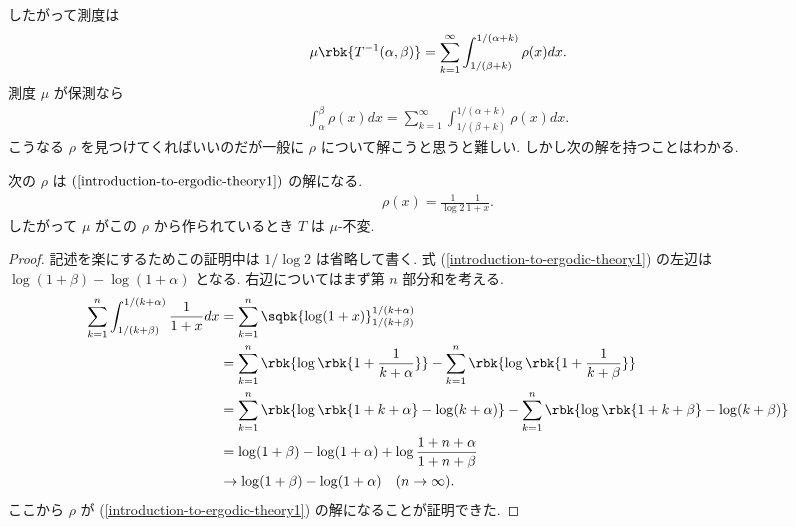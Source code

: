 \documentclass[openany, a4paper, oneside]{jsbook}
\begin{document}
したがって測度は
\begin{align}
 \mu \rbk{T^{-1} (\alpha, \beta)}
 =
 \sum_{k=1}^{\infty} \int_{1 / (\beta + k)}^{1 / (\alpha + k)} \rho (x) dx.
\end{align}
測度 $\mu$ が保測なら
\begin{align}
 \int_{\alpha}^{\beta} \rho(x) dx
 =
 \sum_{k=1}^{\infty} \int_{1 / (\beta + k)}^{1 / (\alpha + k)} \rho (x) dx. \label{introduction-to-ergodic-theory1}
\end{align}
こうなる $\rho$ を見つけてくればいいのだが一般に $\rho$ について解こうと思うと難しい.
しかし次の解を持つことはわかる.
\begin{thm}[不変測度]\label{introduction-to-ergodic-theory24}
次の $\rho$ は $(\ref{introduction-to-ergodic-theory1})$ の解になる.
\begin{align}
 \rho (x)
 =
 \frac{1}{\log 2} \frac{1}{1 + x}.
\end{align}
したがって $\mu$ がこの $\rho$ から作られているとき $T$ は $\mu$-不変.
\end{thm}
\begin{proof}
記述を楽にするためこの証明中は $1 / \log 2$ は省略して書く.
式 (\ref{introduction-to-ergodic-theory1}) の左辺は $\log (1 + \beta) - \log (1 + \alpha)$ となる.
右辺についてはまず第 $n$ 部分和を考える.
\begin{align}
 \sum_{k=1}^{n} \int_{1 / (k + \beta)}^{1 / (k + \alpha)} \frac{1}{1 + x} dx
 &=
 \sum_{k=1}^{n} \sqbk{\log (1 + x)}_{1 / (k + \beta)}^{1 / (k + \alpha)} \\
 &=
 \sum_{k=1}^{n} \rbk{\log \rbk{1 + \frac{1}{k + \alpha}}} - \sum_{k=1}^{n} \rbk{\log \rbk{1 + \frac{1}{k + \beta}}} \\
 &=
 \sum_{k=1}^{n} \rbk{\log \rbk{1 + k + \alpha} - \log (k + \alpha)} -
  \sum_{k=1}^{n} \rbk{\log \rbk{1 + k + \beta} - \log (k + \beta)} \\
 &=
 \log (1 + \beta) - \log (1 + \alpha) + \log \frac{1 + n + \alpha}{1 + n + \beta} \\
 &\to
 \log (1 + \beta) - \log (1 + \alpha) \quad (n \to \infty).
\end{align}
ここから $\rho$ が (\ref{introduction-to-ergodic-theory1}) の解になることが証明できた.
\end{proof}
\end{document}
